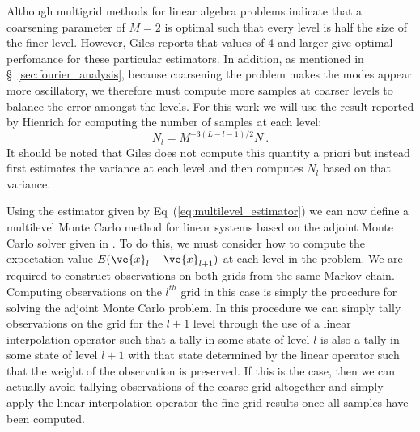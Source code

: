 \documentclass[note]{TechNote}
\begin{document}
Although multigrid methods for linear algebra problems indicate that a
coarsening parameter of $M = 2$ is optimal such that every level is
half the size of the finer level. However, Giles reports that values
of 4 and larger give optimal perfomance for these particular
estimators. In addition, as mentioned in
\S~\ref{sec:fourier_analysis}, because coarsening the problem makes
the modes appear more oscillatory, we therefore must compute more
samples at coarser levels to balance the error amongst the levels. For
this work we will use the result reported by Hienrich for computing
the number of samples at each level:
\begin{equation}
  N_l = M^{-3(L-l-1)/2}N\:.
  \label{eq:level_histories}
\end{equation}
It should be noted that Giles does not compute this quantity a priori
but instead first estimates the variance at each level and then
computes $N_l$ based on that variance.

Using the estimator given by Eq~(\ref{eq:multilevel_estimator}) we can
now define a multilevel Monte Carlo method for linear systems based on
the adjoint Monte Carlo solver given in \cite{evans_monte_2012}. To do
this, we must consider how to compute the expectation value
$E(\ve{x}_{l} - \ve{x}_{l+1})$ at each level in the problem. We are
required to construct observations on both grids from the same Markov
chain. Computing observations on the $l^{th}$ grid in this case is
simply the procedure for solving the adjoint Monte Carlo problem. In
this procedure we can simply tally observations on the grid for the
$l+1$ level through the use of a linear interpolation operator such
that a tally in some state of level $l$ is also a tally in some state
of level $l+1$ with that state determined by the linear operator such
that the weight of the observation is preserved. If this is the case,
then we can actually avoid tallying observations of the coarse grid
altogether and simply apply the linear interpolation operator the fine
grid results once all samples have been computed.
\end{document}
